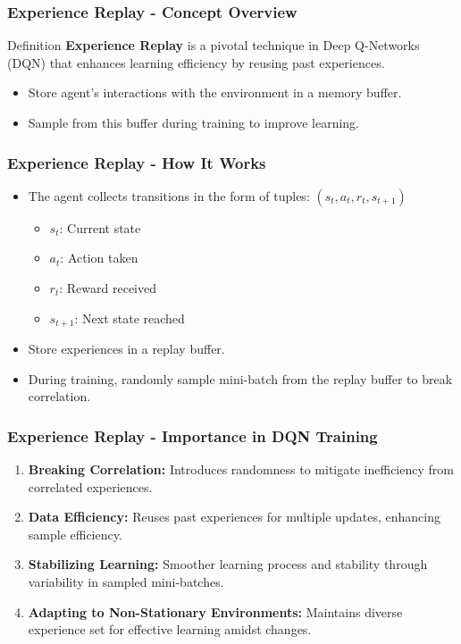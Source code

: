 \documentclass[aspectratio=169]{beamer}
\begin{document}
\begin{frame}[fragile]
    \frametitle{Experience Replay - Concept Overview}
    \begin{block}{Definition}
        \textbf{Experience Replay} is a pivotal technique in Deep Q-Networks (DQN) that enhances learning efficiency by reusing past experiences.
    \end{block}
    \begin{itemize}
        \item Store agent's interactions with the environment in a memory buffer.
        \item Sample from this buffer during training to improve learning.
    \end{itemize}
\end{frame}

\begin{frame}[fragile]
    \frametitle{Experience Replay - How It Works}
    \begin{itemize}
        \item The agent collects transitions in the form of tuples: \((s_t, a_t, r_t, s_{t+1})\)
        \begin{itemize}
            \item \(s_t\): Current state
            \item \(a_t\): Action taken
            \item \(r_t\): Reward received
            \item \(s_{t+1}\): Next state reached
        \end{itemize}
        \item Store experiences in a replay buffer.
        \item During training, randomly sample mini-batch from the replay buffer to break correlation.
    \end{itemize}
\end{frame}

\begin{frame}[fragile]
    \frametitle{Experience Replay - Importance in DQN Training}
    \begin{enumerate}
        \item \textbf{Breaking Correlation:} Introduces randomness to mitigate inefficiency from correlated experiences.
        \item \textbf{Data Efficiency:} Reuses past experiences for multiple updates, enhancing sample efficiency.
        \item \textbf{Stabilizing Learning:} Smoother learning process and stability through variability in sampled mini-batches.
        \item \textbf{Adapting to Non-Stationary Environments:} Maintains diverse experience set for effective learning amidst changes.
    \end{enumerate}
\end{frame}
\end{document}
